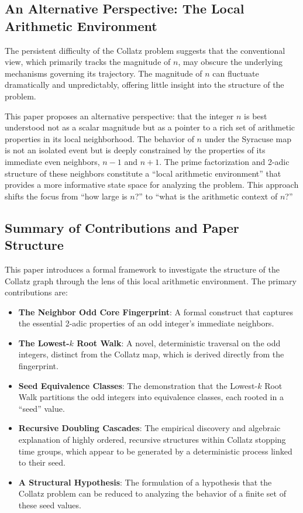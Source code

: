 \documentclass[12pt]{article}
\theoremstyle{plain}
\theoremstyle{definition}
\begin{document}
\subsection{An Alternative Perspective: The Local Arithmetic Environment}

The persistent difficulty of the Collatz problem suggests that the conventional view, which primarily tracks the magnitude of $n$, may obscure the underlying mechanisms governing its trajectory. The magnitude of $n$ can fluctuate dramatically and unpredictably, offering little insight into the structure of the problem.

This paper proposes an alternative perspective: that the integer $n$ is best understood not as a scalar magnitude but as a pointer to a rich set of arithmetic properties in its local neighborhood. The behavior of $n$ under the Syracuse map is not an isolated event but is deeply constrained by the properties of its immediate even neighbors, $n-1$ and $n+1$. The prime factorization and 2-adic structure of these neighbors constitute a ``local arithmetic environment'' that provides a more informative state space for analyzing the problem. This approach shifts the focus from ``how large is $n$?'' to ``what is the arithmetic context of $n$?''

\subsection{Summary of Contributions and Paper Structure}

This paper introduces a formal framework to investigate the structure of the Collatz graph through the lens of this local arithmetic environment. The primary contributions are:
\begin{itemize}
    \item \textbf{The Neighbor Odd Core Fingerprint}: A formal construct that captures the essential 2-adic properties of an odd integer's immediate neighbors.
    \item \textbf{The Lowest-$k$ Root Walk}: A novel, deterministic traversal on the odd integers, distinct from the Collatz map, which is derived directly from the fingerprint.
    \item \textbf{Seed Equivalence Classes}: The demonstration that the Lowest-$k$ Root Walk partitions the odd integers into equivalence classes, each rooted in a ``seed'' value.
    \item \textbf{Recursive Doubling Cascades}: The empirical discovery and algebraic explanation of highly ordered, recursive structures within Collatz stopping time groups, which appear to be generated by a deterministic process linked to their seed.
    \item \textbf{A Structural Hypothesis}: The formulation of a hypothesis that the Collatz problem can be reduced to analyzing the behavior of a finite set of these seed values.
\end{itemize}
\end{document}
